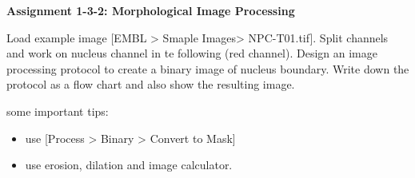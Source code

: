 \textbf{\sffamily
Assignment 1-3-2: Morphological Image Processing
}

Load example image [EMBL > Smaple Images> NPC-T01.tif]. Split channels and work on nucleus channel in te following (red channel). Design an image processing protocol to create a binary image of nucleus boundary. Write down the protocol as a flow chart and also show the resulting image.  

some important tips:
\begin{itemize}
\item use [Process > Binary > Convert to Mask]
\item use erosion, dilation and image calculator. 
\end{itemize}
